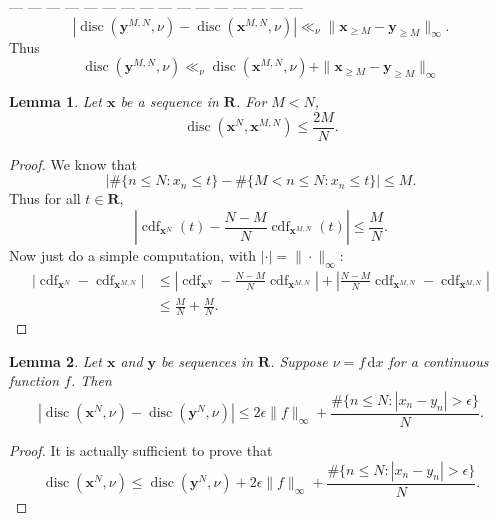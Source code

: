 \documentclass{article}
\DeclareMathOperator{\cdf}{cdf}
\DeclareMathOperator{\disc}{disc}
\newcommand{\bR}{\mathbf{R}}
\newcommand{\bx}{{\boldsymbol x}}
\newcommand{\by}{{\boldsymbol y}}
\newcommand{\dd}{\mathrm{d}}
\newtheorem{lemma}{Lemma}
\begin{document}
--- --- --- --- --- --- --- --- --- --- --- --- --- --- --- --- 
\[
	|\disc(\by^{M,N},\nu)  - \disc(\bx^{M,N},\nu)| \ll_\nu \|\bx_{\geqslant M} - \by_{\geqslant M}\|_\infty .
\]
Thus 
\[
	\disc(\by^{M,N},\nu) \ll_\nu \disc(\bx^{M,N},\nu) + \|\bx_{\geqslant M} - \by_{\geqslant M}\|_\infty
\]

\begin{lemma}
Let $\bx$ be a sequence in $\bR$. For $M < N$, 
\[
	\disc(\bx^N, \bx^{M,N}) \leqslant \frac{2 M}{N} .
\]
\end{lemma}
\begin{proof}
We know that 
\[
	|\#\{n\leqslant N : x_n \leqslant t\} - \#\{M < n \leqslant N : x_n \leqslant t\}| \leqslant M .
\]
Thus for all $t\in \bR$, 
\[
	|\cdf_{\bx^N}(t) - \frac{N - M}{N} \cdf_{\bx^{M,N}}(t)|\leqslant \frac M N .
\]
Now just do a simple computation, with $|\cdot| = \|\cdot\|_\infty$:
\begin{align*}
	|\cdf_{\bx^N} - \cdf_{\bx^{M,N}}| 
		&\leqslant \left|\cdf_{\bx^N} - \frac{N - M}{N} \cdf_{\bx^{M,N}}\right| + \left|\frac{N - M}{N} \cdf_{\bx^{M,N}} - \cdf_{\bx^{M,N}}\right| \\
		&\leqslant \frac M N + \frac M N .
\end{align*}
\end{proof}

\begin{lemma}
Let $\bx$ and $\by$ be sequences in $\bR$. Suppose $\nu = f\, \dd x$ for a 
continuous function $f$. Then 
\[
	|\disc(\bx^N,\nu) - \disc(\by^N,\nu)| \leqslant 2\epsilon\|f\|_\infty + \frac{\# \{n\leqslant N : |x_n - y_n| > \epsilon\}}{N} .
\]
\end{lemma}
\begin{proof}
It is actually sufficient to prove that 
\[
	\disc(\bx^N,\nu) \leqslant \disc(\by^N,\nu) + 2\epsilon \|f\|_\infty + \frac{\# \{n\leqslant N : |x_n - y_n| > \epsilon\}}{N} .
\]
\end{proof}
\end{document}
